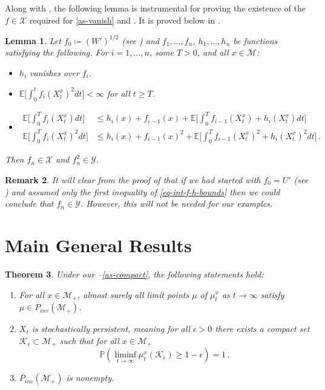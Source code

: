 \documentclass[final]{amsart}
\newtheorem{thm}{Theorem}
\newtheorem{lem}[thm]{Lemma}
\newtheorem{rem}[thm]{Remark}
\numberwithin{thm}{section}
\numberwithin{equation}{section}
\newcommand{\E}{\mathbb{E}}
\newcommand{\Prb}{\mathbb{P}}
\newcommand{\mcM}{\mathcal{M}}
\newcommand{\inv}{\mathcal{M}_+}
\newcommand{\K}{\mathcal{K}}
\newcommand{\X}{\mathcal{X}}
\newcommand{\Y}{\mathcal{Y}}
\begin{document}
Along with , the following lemma is instrumental for proving the existence of the $f \in \X$ required for \ref{as-vanish} and . It is proved below in .



\begin{lem}\label{fn-in-X}
    Let $f_0 \coloneqq (W')^{1/2}$ (see ) and $f_1,\dots,f_n$, $h_1,\dots,h_n$ be functions satisfying the following. For $i = 1,\dots,n$, some $T > 0$, and all $x \in \mcM$:
    \begin{itemize}
        \item $h_i$ vanishes over $f_i$.
        \item $\E\Big[\int_0^t f_i(X_t^x)^2dt\Big] < \infty$ for all $t \geq T$.
        \item
        \begin{equation}\label{eq-int-f-h-bounds}
            \begin{aligned}
                 \E\Big[\int_0^T f_i(X_t^x)dt\Big] &\leq h_i(x) + f_{i-1}(x) + \E\Big[\int_0^T f_{i-1}(X_t^x) + h_i(X_t^x)dt\Big] \\
                \E\Big[\int_0^T f_i(X_t^x)^2dt\Big] &\leq h_i(x) + f_{i-1}(x)^2 + \E\Big[\int_0^T f_{i-1}(X_t^x)^2 + h_i(X_t^x)^2dt\Big] \,.
            \end{aligned} 
        \end{equation}
    \end{itemize}
    Then $f_n \in \X$ and $f_n^2 \in \Y$.
\end{lem}
\begin{rem}
    It will clear from the proof of  that if we had started with $f_0 = U'$ (see ) and assumed only the first inequality of \eqref{eq-int-f-h-bounds} then we could conclude that $f_n \in \Y$. However, this will not be needed for our examples.
\end{rem}





\section{Main General Results}\label{results}
\begin{thm} \label{main}
    Under our --\ref{as-compact}, the following statements hold: \begin{enumerate}[label=(\roman*)]
        \item For all $x \in \inv$, almost surely all limit points $\mu$ of $\mu_t^x$ as $t \to \infty$ satisfy $\mu \in P_{inv}(\inv)$.
        \item $X_t$ is stochastically persistent, meaning for all $\epsilon > 0$ there exists a compact set $\K_\epsilon \subset \inv$ such that for all $x \in \inv$ $$\Prb(\liminf_{t \to \infty} \mu_t^x(\K_\epsilon) \geq 1 - \epsilon) = 1 \,.$$
        \item $P_{inv}(\inv)$ is nonempty.
    \end{enumerate}
\end{thm}
\end{document}
